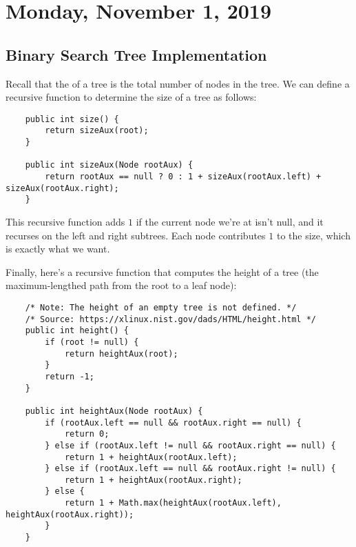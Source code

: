 \section{Monday, November 1, 2019}

\subsection{Binary Search Tree Implementation}
    
Recall that the  of a tree is the total number of nodes in the tree.  We can define a recursive function to determine the size of a tree as follows:


\begin{lstlisting}
	public int size() {
		return sizeAux(root);
	}

	public int sizeAux(Node rootAux) {
		return rootAux == null ? 0 : 1 + sizeAux(rootAux.left) + sizeAux(rootAux.right);
	}
\end{lstlisting}

This recursive function adds $1$ if the current node we're at isn't null, and it recurses on the left and right subtrees. Each node contributes $1$ to the size, which is exactly what we want.


Finally, here's a recursive function that computes the height of a tree (the maximum-lengthed path from the root to a leaf node):

\begin{lstlisting}
    /* Note: The height of an empty tree is not defined. */
	/* Source: https://xlinux.nist.gov/dads/HTML/height.html */
	public int height() {
		if (root != null) {
			return heightAux(root);
		}
		return -1;
	}
	
	public int heightAux(Node rootAux) {
		if (rootAux.left == null && rootAux.right == null) {
			return 0;
		} else if (rootAux.left != null && rootAux.right == null) {
			return 1 + heightAux(rootAux.left);
		} else if (rootAux.left == null && rootAux.right != null) {
			return 1 + heightAux(rootAux.right);
		} else {
			return 1 + Math.max(heightAux(rootAux.left), heightAux(rootAux.right));
		}
	}
\end{lstlisting}